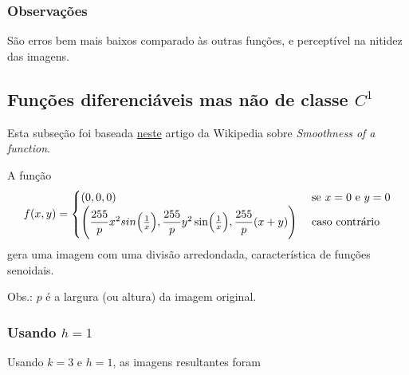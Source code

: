 \documentclass{article}
\begin{document}
\subsubsection{Observações}

São erros bem mais baixos comparado às outras funções, e perceptível na
nitidez das imagens.

\subsection[Funções diferenciáveis mas não de classe C1]{Funções diferenciáveis mas não de classe $C^1$}

Esta subseção foi baseada \href{https://en.wikipedia.org/wiki/Smoothness}{neste}
artigo da Wikipedia sobre \textit{Smoothness of a function}.

A função
\begin{equation}
  f(x,y) = \begin{cases}
  (0, 0, 0) & \mbox{ se } x = 0 \mbox{ e } y = 0 \\
  \Biggl(
    \dfrac{255}{p} x^2 sin\Bigl(\frac{1}{x}\Bigr)
  , \dfrac{255}{p} y^2 \sin \Bigl( \frac{1}{x} \Bigr)
  , \dfrac{255}{p} (x+y)
  \Biggr) &\text{ caso contrário}
  \end{cases}
\end{equation}
gera uma imagem com uma divisão arredondada, característica de funções senoidais.

Obs.: $p$ é a largura (ou altura) da imagem original.

\subsubsection[Usando h=1]{Usando $h=1$}

Usando $k=3$ e $h=1$, as imagens resultantes foram
\end{document}
